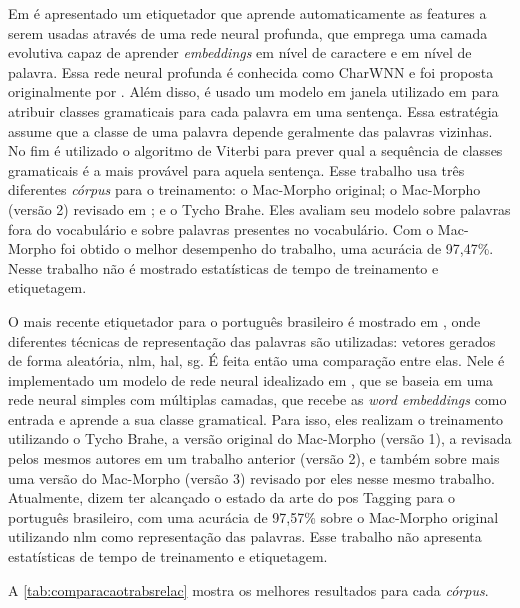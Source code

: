 
Em \cite{dos2014training} é apresentado um etiquetador que aprende automaticamente as features a serem usadas através de uma rede neural profunda, que emprega uma camada evolutiva capaz de aprender \textit{embeddings} em nível de caractere e em nível de palavra. Essa rede neural profunda é conhecida como CharWNN e foi proposta originalmente por . Além disso, é usado um modelo em janela utilizado em \cite{collobert2011natural} para atribuir classes gramaticais para cada palavra em uma sentença. Essa estratégia assume que a classe de uma palavra depende geralmente das palavras vizinhas. No fim é utilizado o algoritmo de Viterbi \cite{viterbi1967error} para prever qual a sequência de classes gramaticais é a mais provável para aquela sentença. Esse trabalho usa três diferentes \textit{córpus} para o treinamento: o Mac-Morpho original; o Mac-Morpho (versão 2) revisado em \cite{fonseca2013mac}; e o Tycho Brahe. Eles avaliam seu modelo sobre palavras fora do vocabulário e sobre palavras presentes no vocabulário. Com o Mac-Morpho foi obtido o melhor desempenho do trabalho, uma acurácia de 97,47\%. Nesse trabalho não é mostrado estatísticas de tempo de treinamento e etiquetagem.

O mais recente etiquetador para o português brasileiro é mostrado em \cite{fonseca2015evaluating}, onde diferentes técnicas de representação das palavras são utilizadas: vetores gerados de forma aleatória, \ac{nlm}, \ac{hal}, \ac{sg}. É feita então uma comparação entre elas. Nele é implementado um modelo de rede neural idealizado em \cite{collobert2008unified}, que se baseia em uma rede neural simples com múltiplas camadas, que recebe as \textit{word embeddings} como entrada e aprende a sua classe gramatical. Para isso, eles realizam o treinamento utilizando o Tycho Brahe, a versão original do Mac-Morpho (versão 1), a revisada pelos mesmos autores em um trabalho anterior \cite{fonseca2013mac} (versão 2), e também sobre mais uma versão do Mac-Morpho (versão 3) revisado por eles nesse mesmo trabalho. Atualmente,  dizem ter alcançado o estado da arte do \ac{pos} Tagging para o português brasileiro, com uma acurácia de 97,57\% sobre o Mac-Morpho original utilizando \ac{nlm} como representação das palavras. Esse trabalho não apresenta estatísticas de tempo de treinamento e etiquetagem.

A \autoref{tab:comparacaotrabsrelac} mostra os melhores resultados para cada \textit{córpus}.



